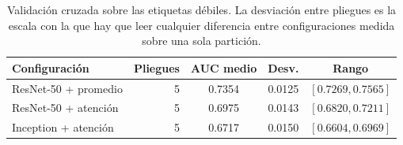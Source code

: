 \begin{table}[ht]
\centering
\caption{Validación cruzada sobre las etiquetas débiles. La desviación entre pliegues es la escala con la que hay que leer cualquier diferencia entre configuraciones medida sobre una sola partición.}
\label{tab:cruzada}
\begin{tabular}{lrccc}
\toprule
Configuración & Pliegues & AUC medio & Desv. & Rango \\
\midrule
ResNet-50 + promedio & 5 & 0.7354 & 0.0125 & $[0.7269, 0.7565]$ \\
ResNet-50 + atención & 5 & 0.6975 & 0.0143 & $[0.6820, 0.7211]$ \\
Inception + atención & 5 & 0.6717 & 0.0150 & $[0.6604, 0.6969]$ \\
\bottomrule
\end{tabular}
\end{table}
